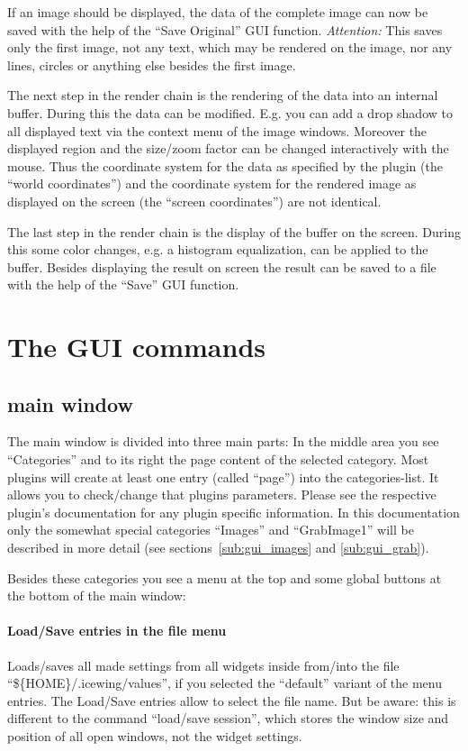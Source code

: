 If an image should be displayed, the data of the complete image can
now be saved with the help of the ``Save Original'' GUI
function. \emph{Attention:} This saves only the first image, not any
text, which may be rendered on the image, nor any lines, circles or
anything else besides the first image.

The next step in the render chain is the rendering of the data into
an internal buffer. During this the data can be modified. E.g. you
can add a drop shadow to all displayed text via the context menu of
the image windows. Moreover the displayed region and the size/zoom
factor can be changed interactively with the mouse. Thus the
coordinate system for the data as specified by the plugin (the
``world coordinates'') and the coordinate system for the rendered
image as displayed on the screen (the ``screen coordinates'') are not
identical.

The last step in the render chain is the display of the buffer on
the screen. During this some color changes, e.g. a histogram
equalization, can be applied to the buffer. Besides displaying the
result on screen the result can be saved to a file with the help of
the ``Save'' GUI function.

\section{The GUI commands}

\subsection{\icewing{} main window}
The main window is divided into three main parts: 
In the middle area you see ``Categories'' and to its right the page
content of the selected category. Most plugins will create at least
one entry (called ``page'') into the categories-list. It allows you
to check/change that plugins parameters. Please see the
respective plugin's documentation for any plugin specific
information. In this documentation only the somewhat special
categories ``Images'' and ``GrabImage1'' will be described in more
detail (see sections~\ref{sub:gui_images} and \ref{sub:gui_grab}).

Besides these categories you see a menu at the top and some global
buttons at the bottom of the \icewing{} main window:

\paragraph{Load/Save entries in the file menu}
Loads/saves all made settings from all widgets inside \icewing{}
from/into the file ``\$\{HOME\}/.icewing/values'', if you selected the
``default'' variant of the menu entries. The Load/Save
entries allow to select the file name. But be aware: this is
different to the command ``load/save session'', which stores the
window size and position of all open windows, not the widget
settings.

